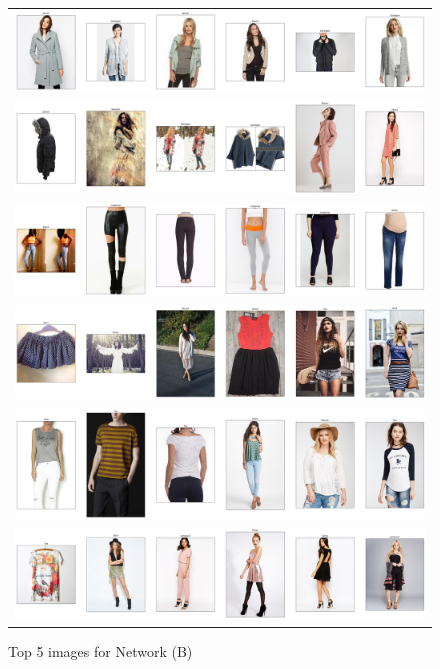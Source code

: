 \documentclass{article}
\begin{document}
\begin{figure}
\begin{tabular}{c}
{\includegraphics[width = 5in]{b/search_idx_3012.png}}\\
{\includegraphics[width = 5in]{b/search_idx_3013.png}}\\
{\includegraphics[width = 5in]{b/search_idx_4002.png}}\\
{\includegraphics[width = 5in]{b/search_idx_7513.png}}\\
{\includegraphics[width = 5in]{b/search_idx_8716.png}}\\
{\includegraphics[width = 5in]{b/search_idx_9388.png}}
\end{tabular}
\caption{Top 5 images for Network (B)}
\label{fig:img_netB}
\end{figure}
\end{document}
